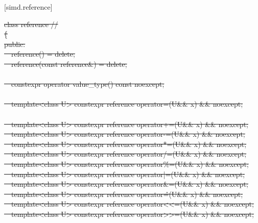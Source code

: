 \begin{wgBRem}
[simd.reference]{\texorpdfstring{}{Element references}}

\pnum
{}

\pnum
{}

\begingroup\noindent\ttfamily
\st{class reference // \mbox{\expos}\\
\{\\
public:\\
\ \ reference() = delete;\\
\ \ reference(const reference\&) = delete;\\
\\
\ \ constexpr operator value_type() const noexcept;\\
\\
\ \ template<class U> constexpr reference operator=(U\&\& x) \&\& noexcept;\\
\\
\ \ template<class U> constexpr reference operator+=(U\&\& x) \&\& noexcept;\\
\ \ template<class U> constexpr reference operator-=(U\&\& x) \&\& noexcept;\\
\ \ template<class U> constexpr reference operator*=(U\&\& x) \&\& noexcept;\\
\ \ template<class U> constexpr reference operator/=(U\&\& x) \&\& noexcept;\\
\ \ template<class U> constexpr reference operator\%=(U\&\& x) \&\& noexcept;\\
\ \ template<class U> constexpr reference operator|=(U\&\& x) \&\& noexcept;\\
\ \ template<class U> constexpr reference operator\&=(U\&\& x) \&\& noexcept;\\
\ \ template<class U> constexpr reference operator\^=(U\&\& x) \&\& noexcept;\\
\ \ template<class U> constexpr reference operator<<=(U\&\& x) \&\& noexcept;\\
\ \ template<class U> constexpr reference operator>>=(U\&\& x) \&\& noexcept;\\
\\
}
\end{wgBRem}
